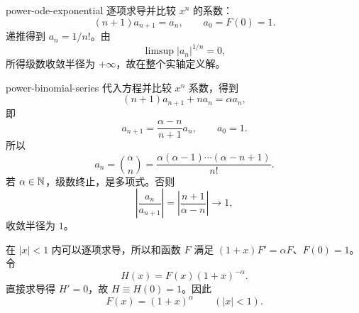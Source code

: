 \begin{solution}{power-ode-exponential}
逐项求导并比较 \(x^n\) 的系数：
\[
 (n+1)a_{n+1}=a_n,\qquad a_0=F(0)=1.
\]
递推得到 \(a_n=1/n!\)。由
\[
 \limsup|a_n|^{1/n}=0,
\]
所得级数收敛半径为 \(+\infty\)，故在整个实轴定义解。
\end{solution}

\begin{solution}{power-binomial-series}
代入方程并比较 \(x^n\) 系数，得到
\[
 (n+1)a_{n+1}+na_n=\alpha a_n,
\]
即
\[
 a_{n+1}=\frac{\alpha-n}{n+1}a_n,\qquad a_0=1.
\]
所以
\[
 a_n=\binom{\alpha}{n}
 =\frac{\alpha(\alpha-1)\cdots(\alpha-n+1)}{n!}.
\]
若 \(\alpha\in\mathbb{N}\)，级数终止，是多项式。否则
\[
 \left|\frac{a_n}{a_{n+1}}\right|
 =\left|\frac{n+1}{\alpha-n}\right|\to1,
\]
收敛半径为 \(1\)。

在 \(|x|<1\) 内可以逐项求导，所以和函数 \(F\) 满足
\((1+x)F'=\alpha F\)、\(F(0)=1\)。令
\[
 H(x)=F(x)(1+x)^{-\alpha}.
\]
直接求导得 \(H'=0\)，故 \(H\equiv H(0)=1\)。因此
\[
 F(x)=(1+x)^\alpha\qquad(|x|<1).
\]
\end{solution}

